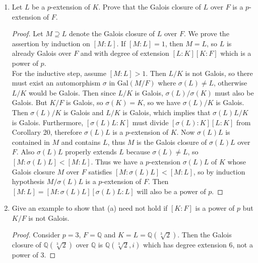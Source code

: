 \documentclass{article}
\begin{document}
  \begin{enumerate}[label={(\alph*)}]
    \item Let $L$ be a $p$-extension of $K$. Prove that the Galois closure
      of $L$ over $F$ is a $p$-extension of $F$.

      \begin{proof}
        Let $M\supseteq L$ denote the Galois closure of $L$ over $F$. We
        prove the assertion by induction on $[M:L]$. If $[M:L]=1$, then
        $M=L$, so $L$ is already Galois over $F$ and with degree of
        extension $[L:K][K:F]$ which is a power of $p$. \\

        For the inductive step, assume $[M:L]>1$. Then $L/K$ is not Galois,
        so there must exist an automorphism $\sigma$ in $\text{Gal}(M/F)$
        where $\sigma(L)\neq L$, otherwise $L/K$ would be Galois. Then
        since $L/K$ is Galois, $\sigma(L)/\sigma(K)$ must also be Galois.
        But $K/F$ is Galois, so $\sigma(K)=K$, so we have $\sigma(L)/K$ is
        Galois. Then $\sigma(L)/K$ is Galois and $L/K$ is Galois, which
        implies that $\sigma(L)L/K$ is Galois. Furthermore,
        $[\sigma(L)L:K]$ must divide $[\sigma(L):K][L:K]$ from Corollary
        20, therefore $\sigma(L)L$ is a $p$-extension of $K$.
        Now $\sigma(L)L$ is contained in $M$ and contains $L$, thus $M$ is
        the Galois closure of $\sigma(L)L$ over $F$. Also
        $\sigma(L)L$ properly extends $L$ because $\sigma(L)\neq L$, so
        $[M:\sigma(L)L]<[M:L]$. Thus we have a $p$-extension $\sigma(L)L$
        of $K$ whose Galois closure $M$ over $F$ satisfies
        $[M:\sigma(L)L]<[M:L]$, so by induction hypothesis $M/\sigma(L)L$
        is a $p$-extension of $F$. Then $[M:L]
        =[M:\sigma(L)L][\sigma(L)L:L]$ will also be a power of $p$.
      \end{proof}

    \item Give an example to show that (a) need not hold if $[K:F]$ is a
      power of $p$ but $K/F$ is not Galois.

      \begin{proof}
        Consider $p=3$, $F=\mathbb{Q}$ and $K=L=\mathbb{Q}(\sqrt[3]{2})$.
        Then the Galois closure of $\mathbb{Q}(\sqrt[3]{2})$ over
        $\mathbb{Q}$ is $\mathbb{Q}(\sqrt[3]{2},i)$ which has degree
        extension 6, not a power of 3.
      \end{proof}
  \end{enumerate}
\end{document}
